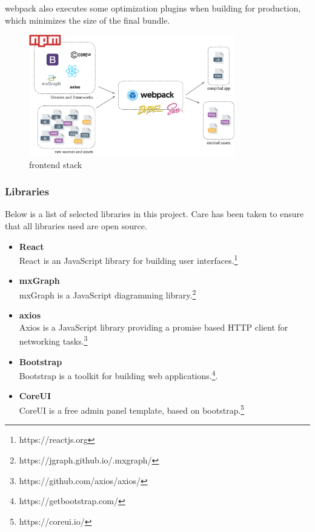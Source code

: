 \documentclass[a4paper,top=25mm,bottom=25mm,12pt,pdftex,halfparskip,twoside,bibtotoc,numbers=noenddot]{scrbook}
\begin{document}
webpack also executes some optimization plugins when building for production, which minimizes the size of the final bundle.

\begin{figure}[H]
  \centering
  \vspace{0.8cm}
  \includegraphics[width=0.8\textwidth]{frontend-setup}
  \caption{frontend stack}
\end{figure}

\subsubsection{Libraries}
Below is a list of selected libraries in this project. Care has been taken to ensure that all libraries used are open source.
\begin{itemize}
\item \textbf{React}\\
React is an JavaScript library for building user interfaces.\footnote{https://reactjs.org}
\item \textbf{mxGraph}\\
mxGraph is a JavaScript diagramming library.\footnote{https://jgraph.github.io/.mxgraph/}
\item \textbf{axios}\\
Axios is a JavaScript library providing a promise based HTTP client for networking tasks.\footnote{https://github.com/axios/axios/}
\item \textbf{Bootstrap}\\
Bootstrap is a toolkit for building web applications.\footnote{https://getbootstrap.com/}.
\item \textbf{CoreUI}\\
CoreUI is a free admin panel template, based on bootstrap.\footnote{https://coreui.io/}
\end{itemize}
\end{document}
